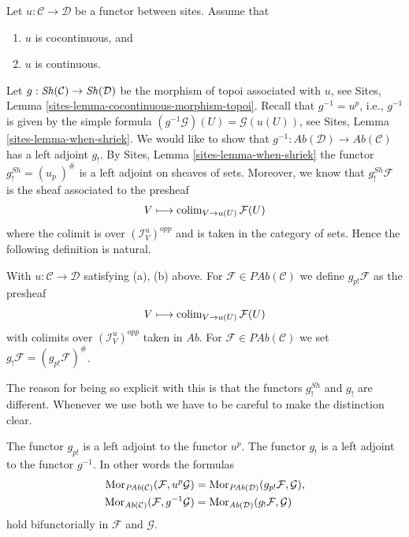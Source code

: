 \noindent
Let $u : \mathcal{C} \to \mathcal{D}$ be a functor between sites.
Assume that
\begin{enumerate}
\item[(a)] $u$ is cocontinuous, and
\item[(b)] $u$ is continuous.
\end{enumerate}
Let $g : \mathop{\mathit{Sh}}\nolimits(\mathcal{C}) \to \mathop{\mathit{Sh}}\nolimits(\mathcal{D})$ be the
morphism of topoi associated with $u$, see
Sites, Lemma \ref{sites-lemma-cocontinuous-morphism-topoi}.
Recall that $g^{-1} = u^p$, i.e., $g^{-1}$ is given by the simple formula
$(g^{-1}\mathcal{G})(U) = \mathcal{G}(u(U))$, see
Sites, Lemma \ref{sites-lemma-when-shriek}.
We would like to show that
$g^{-1} : \textit{Ab}(\mathcal{D}) \to \textit{Ab}(\mathcal{C})$
has a left adjoint $g_!$. By
Sites, Lemma \ref{sites-lemma-when-shriek}
the functor $g^{Sh}_! = (u_p\ )^\#$ is a left adjoint on sheaves of sets.
Moreover, we know that $g^{Sh}_!\mathcal{F}$ is the sheaf
associated to the presheaf
$$
V \longmapsto \mathop{\mathrm{colim}}\nolimits_{V \to u(U)} \mathcal{F}(U)
$$
where the colimit is over $(\mathcal{I}_V^u)^{opp}$ and is taken in the
category of sets. Hence the following definition is natural.

\begin{definition}
\label{definition-g-shriek}
With $u : \mathcal{C} \to \mathcal{D}$ satisfying (a), (b) above.
For $\mathcal{F} \in \textit{PAb}(\mathcal{C})$ we define
{\it $g_{p!}\mathcal{F}$} as the presheaf
$$
V \longmapsto \mathop{\mathrm{colim}}\nolimits_{V \to u(U)} \mathcal{F}(U)
$$
with colimits over $(\mathcal{I}_V^u)^{opp}$ taken in $\textit{Ab}$. For
$\mathcal{F} \in \textit{PAb}(\mathcal{C})$ we set
{\it $g_!\mathcal{F} = (g_{p!}\mathcal{F})^\#$}.
\end{definition}

\noindent
The reason for being so explicit with this is that the functors
$g^{Sh}_!$ and $g_!$ are different. Whenever we use both
we have to be careful to make the distinction clear.

\begin{lemma}
\label{lemma-g-shriek-adjoint}
The functor $g_{p!}$ is a left adjoint to the functor $u^p$.
The functor $g_!$ is a left adjoint to the functor $g^{-1}$.
In other words the formulas
\begin{align*}
\mathop{\mathrm{Mor}}\nolimits_{\textit{PAb}(\mathcal{C})}(\mathcal{F}, u^p\mathcal{G})
& =
\mathop{\mathrm{Mor}}\nolimits_{\textit{PAb}(\mathcal{D})}(g_{p!}\mathcal{F}, \mathcal{G}), \\
\mathop{\mathrm{Mor}}\nolimits_{\textit{Ab}(\mathcal{C})}(\mathcal{F}, g^{-1}\mathcal{G})
& =
\mathop{\mathrm{Mor}}\nolimits_{\textit{Ab}(\mathcal{D})}(g_!\mathcal{F}, \mathcal{G})
\end{align*}
hold bifunctorially in $\mathcal{F}$ and $\mathcal{G}$.
\end{lemma}


